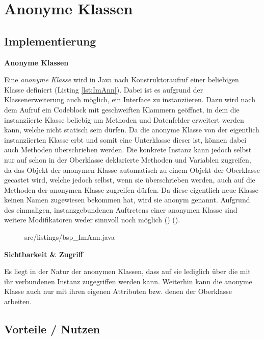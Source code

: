 \section{Anonyme Klassen}
\subsection {Implementierung}

{\Large \bf Anonyme Klassen}

Eine {\it anonyme Klasse} wird in Java nach Konstruktoraufruf einer beliebigen Klasse definiert (Listing \ref{lst:ImAnn}). Dabei ist es aufgrund der Klassenerweiterung auch möglich, ein Interface zu instanziieren.
Dazu wird nach dem Aufruf ein Codeblock mit geschweiften Klammern geöffnet, in dem die instanziierte Klasse beliebig um Methoden und Datenfelder erweitert werden kann, welche nicht statisch sein dürfen.
Da die anonyme Klasse von der eigentlich instanziierten Klasse erbt und somit eine Unterklasse dieser ist, können dabei auch Methoden überschrieben werden.
Die konkrete Instanz kann jedoch selbst nur auf schon in der Oberklasse deklarierte Methoden und Variablen zugreifen, da das Objekt der anonymen Klasse automatisch zu einem Objekt der Oberklasse gecastet wird, welche jedoch selbst, wenn sie überschrieben werden, auch auf die Methoden der anonymen Klasse zugreifen dürfen.
Da diese eigentlich neue Klasse keinen Namen zugewiesen bekommen hat, wird sie anonym genannt.
Aufgrund des einmaligen, instanzgebundenen Auftretens einer anonymen Klasse sind weitere Modifikatoren weder sinnvoll noch möglich (\cite{goll2013java}) (\cite{Oracle:JLS9}).

\begin{figure}[hbt]
\lstset{language=Java}
 {src/listings/bsp_ImAnn.java}
\end{figure}

{\bf Sichtbarkeit \& Zugriff}

Es liegt in der Natur der anonymen Klassen, dass auf sie lediglich über die mit ihr verbundenen Instanz zugegriffen werden kann.
Weiterhin kann die anonyme Klasse auch nur mit ihren eigenen Attributen bzw. denen der Oberklasse arbeiten.

\subsection{Vorteile / Nutzen}

